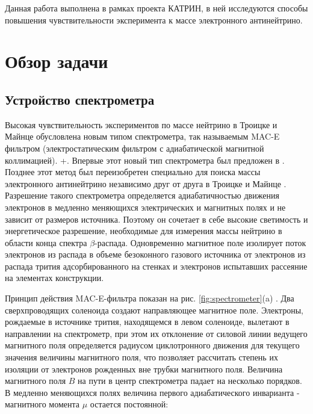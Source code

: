 ﻿\documentclass[a4paper,14pt]{extarticle}
\begin{document}
    Данная работа выполнена в рамках проекта КАТРИН, в ней исследуются способы повышения 
    чувствительности эксперимента к массе электронного антинейтрино. 
    
     



    \newpage
    \section{Обзор задачи}
    \subsection{Устройство спектрометра}
    Высокая чувствительность экспериментов по массе нейтрино в Троицке и Майнце обусловлена
    новым типом спектрометра, так называемым MAC-E фильтром (электростатическим фильтром с адиабатической магнитной коллимацией). 
    +. Впервые этот новый тип спектрометра был предложен
    в \cite{Beamson_1980}. Позднее этот метод был переизобретен специально для поиска массы электронного
    антинейтрино независимо друг от друга в Троицке и Майнце \cite{lobashev} \cite{picard}. Разрешение такого спектрометра определяется адиабатичностью движения электронов в медленно меняющихся электрических и магнитных полях и не зависит от размеров источника. Поэтому он сочетает в 
    себе высокие светимость и энергетическое разрешение, необходимые для измерения массы нейтрино в области конца спектра $\beta$-распада. Одновременно магнитное поле изолирует поток электронов из распада в объеме безоконного газового источника от электронов из распада трития адсорбированного на стенках и электронов испытавших рассеяние на элементах конструкции.  
    
    Принцип действия MAC-E-фильтра показан на рис. \ref{fig:spectrometer}(a) \cite{design_report}. 
    Два сверхпроводящих соленоида создают направляющее магнитное поле. Электроны, рождаемые в источнике
    трития, находящемся в левом соленоиде, вылетают в направлении на спектрометр, при этом их отклонение от силовой линии ведущего магнитного поля определяется радиусом циклотронного движения для текущего значения величины магнитного поля, что позволяет рассчитать степень их изоляции  
    от электронов рожденных вне трубки магнитного поля. Величина магнитного поля $B$ на пути в центр спектрометра падает на несколько порядков. 
В медленно меняющихся полях величина первого адиабатического инварианта - магнитного момента $\mu$ остается постоянной:
    
\end{document}
